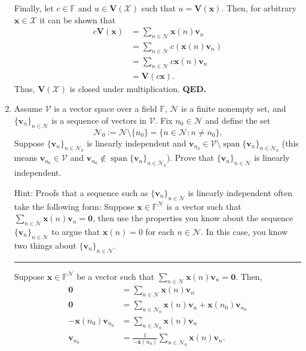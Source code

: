\documentclass[12pt]{amsart}
\newcommand{\1}{\mathbbm{1}}
\numberwithin{equation}{section}
\numberwithin{Theorem}{section}
\theoremstyle{plain} %
\theoremstyle{definition}
\theoremstyle{remark}
\begin{document}
\begin{enumerate}[1.]
Finally, let $c\in\mathbb{F}$ and $u\in\mathbf{V}(\mathcal{X})$ such that $u=\mathbf{V}(\mathbf{x})$.
Then, for arbitrary $\mathbf{x}\in\mathcal{X}$ it can be shown that  
\begin{align*}
	c\mathbf{V}(\mathbf{x})
	&= \sum_{n\in\mathcal{N}}\mathbf{x}(n)\mathbf{v}_n \\
	&= \sum_{n\in\mathcal{N}}c(\mathbf{x}(n)\mathbf{v}_n) \\
	&= \sum_{n\in\mathcal{N}}c\mathbf{x}(n)\mathbf{v}_n \\
	&= \mathbf{V}(c\mathbf{x}).
\end{align*}
Thus, $\mathbf{V}(\mathcal{X})$ is closed under multiplication. \textbf{QED.}

\newpage

\item Assume \(\mathcal{V}\) is a vector space over a field \(\mathbb{F}\), \(\mathcal{N}\) is a finite nonempty set, and \(\{\mathbf{v}_{n}\}_{n\in\mathcal{N}}\) is a sequence of vectors in \(\mathcal{V}\). Fix \(n_{0}\in\mathcal{N}\) and define the set
\[\mathcal{N}_{0} := \mathcal{N}\setminus\{n_{0}\} = \{n\in\mathcal{N} : n\neq n_{0}\}.\]
 Suppose \(\{\mathbf{v}_{n}\}_{n\in\mathcal{N}_{0}}\) is linearly independent and \(\mathbf{v}_{n_{0}}\in\mathcal{V}\setminus\operatorname{span}\{\mathbf{v}_{n}\}_{n\in\mathcal{N}_{0}}\) (this means \(\mathbf{v}_{n_{0}}\in\mathcal{V}\) and \(\mathbf{v}_{n_{0}}\notin\operatorname{span}\{\mathbf{v}_{n}\}_{n\in\mathcal{N}_{0}}\)). Prove that \(\{\mathbf{v}_{n}\}_{n\in\mathcal{N}}\) is linearly independent.


Hint: Proofs that a sequence such as \(\{\mathbf{v}_{n}\}_{n\in\mathcal{N}}\) is linearly independent often take the following form: Suppose \(\mathbf{x}\in\mathbb{F}^{\mathcal{N}}\) is a vector such that \(\sum_{n\in\mathcal{N}}\mathbf{x}(n)\mathbf{v}_{n} = \mathbf{0}\), then use the properties you know about the sequence \(\{\mathbf{v}_{n}\}_{n\in\mathcal{N}}\) to argue that \(\mathbf{x}(n) = 0\) for each \(n\in\mathcal{N}\). In this case, you know two things about \(\{\mathbf{v}_{n}\}_{n\in\mathcal{N}}\).
\\
\hrule
\bigskip

Suppose $\mathbf{x}\in\mathbb{F}^{\mathcal{N}}$ be a vector such that $\sum_{n\in\mathcal{N}}\mathbf{x}(n)\mathbf{v}_{n} = \mathbf{0}$. Then,\\

\begin{align*}
	\mathbf{0} &=\sum_{n\in\mathcal{N}}\mathbf{x}(n)\mathbf{v}_{n} \\
	\mathbf{0} &= \sum_{n\in\mathcal{N}_{0}}\mathbf{x}(n)\mathbf{v}_{n} +  \mathbf{x}(n_0)\mathbf{v}_{n_{0}}\\
	-\mathbf{x}(n_0)\mathbf{v}_{n_{0}} &= \sum_{n\in\mathcal{N}_{0}}\mathbf{x}(n)\mathbf{v}_{n} \\
	\mathbf{v}_{n_{0}}  &= \frac{1}{-\mathbf{x}(n_0)} \sum_{n\in\mathcal{N}_{0}}\mathbf{x}(n)\mathbf{v}_{n}. \\
\end{align*}


\end{enumerate}
\end{document}
